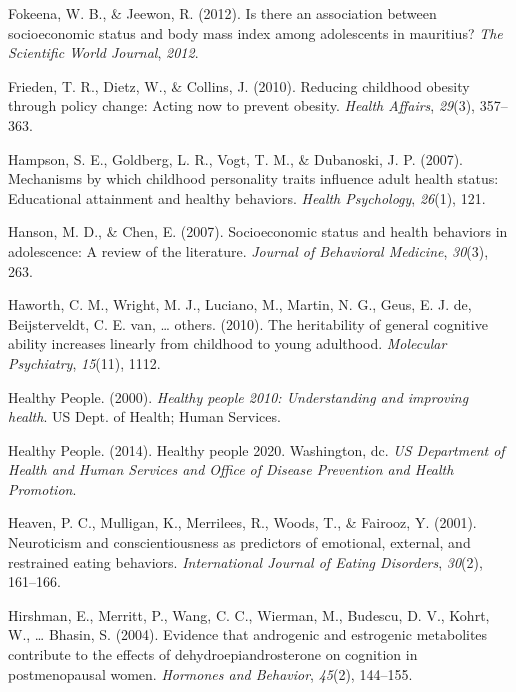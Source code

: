 \documentclass[man]{apa6}
\begin{document}
\leavevmode\hypertarget{ref-fokeena2012there}{}%
Fokeena, W. B., \& Jeewon, R. (2012). Is there an association between socioeconomic status and body mass index among adolescents in mauritius? \emph{The Scientific World Journal}, \emph{2012}.

\leavevmode\hypertarget{ref-frieden2010reducing}{}%
Frieden, T. R., Dietz, W., \& Collins, J. (2010). Reducing childhood obesity through policy change: Acting now to prevent obesity. \emph{Health Affairs}, \emph{29}(3), 357--363.

\leavevmode\hypertarget{ref-hampson2007mechanisms}{}%
Hampson, S. E., Goldberg, L. R., Vogt, T. M., \& Dubanoski, J. P. (2007). Mechanisms by which childhood personality traits influence adult health status: Educational attainment and healthy behaviors. \emph{Health Psychology}, \emph{26}(1), 121.

\leavevmode\hypertarget{ref-hanson2007socioeconomic}{}%
Hanson, M. D., \& Chen, E. (2007). Socioeconomic status and health behaviors in adolescence: A review of the literature. \emph{Journal of Behavioral Medicine}, \emph{30}(3), 263.

\leavevmode\hypertarget{ref-haworth2010heritability}{}%
Haworth, C. M., Wright, M. J., Luciano, M., Martin, N. G., Geus, E. J. de, Beijsterveldt, C. E. van, \ldots{} others. (2010). The heritability of general cognitive ability increases linearly from childhood to young adulthood. \emph{Molecular Psychiatry}, \emph{15}(11), 1112.

\leavevmode\hypertarget{ref-healthy2000healthy}{}%
Healthy People. (2000). \emph{Healthy people 2010: Understanding and improving health}. US Dept. of Health; Human Services.

\leavevmode\hypertarget{ref-us2014healthy}{}%
Healthy People. (2014). Healthy people 2020. Washington, dc. \emph{US Department of Health and Human Services and Office of Disease Prevention and Health Promotion}.

\leavevmode\hypertarget{ref-heaven2001neuroticism}{}%
Heaven, P. C., Mulligan, K., Merrilees, R., Woods, T., \& Fairooz, Y. (2001). Neuroticism and conscientiousness as predictors of emotional, external, and restrained eating behaviors. \emph{International Journal of Eating Disorders}, \emph{30}(2), 161--166.

\leavevmode\hypertarget{ref-hirshman2004evidence}{}%
Hirshman, E., Merritt, P., Wang, C. C., Wierman, M., Budescu, D. V., Kohrt, W., \ldots{} Bhasin, S. (2004). Evidence that androgenic and estrogenic metabolites contribute to the effects of dehydroepiandrosterone on cognition in postmenopausal women. \emph{Hormones and Behavior}, \emph{45}(2), 144--155.
\end{document}

